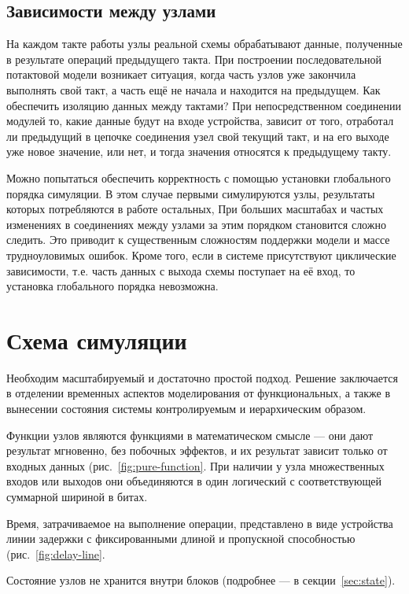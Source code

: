 \subsection{Зависимости между узлами}

На каждом такте работы узлы реальной схемы обрабатывают данные, полученные в результате операций предыдущего такта. При построении последовательной потактовой модели возникает ситуация, когда часть узлов уже закончила выполнять свой такт, а часть ещё не начала и находится на предыдущем. Как обеспечить изоляцию данных между тактами? При непосредственном соединении модулей то, какие данные будут на входе устройства, зависит от того, отработал ли предыдущий в цепочке соединения узел свой текущий такт, и на его выходе уже новое значение, или нет, и тогда значения относятся к предыдущему такту. 

Можно попытаться обеспечить корректность с помощью установки глобального порядка симуляции. В этом случае первыми симулируются узлы, результаты которых потребляются в работе остальных, При больших масштабах и частых изменениях в соединениях между узлами за этим порядком становится сложно следить. Это приводит к существенным сложностям поддержки модели и массе трудноуловимых ошибок. Кроме того, если в системе присутствуют циклические зависимости, т.е. часть данных с выхода схемы поступает на её вход, то установка глобального порядка невозможна.

\section{Схема симуляции}

Необходим масштабируемый и достаточно простой подход. Решение заключается в отделении временных аспектов моделирования от функциональных, а также в вынесении состояния системы контролируемым и иерархическим образом. 

\begin{itemize*}
    \item Функции узлов являются функциями в математическом смысле --- они дают результат мгновенно, без побочных эффектов, и их результат зависит только от входных данных (рис.~\ref{fig:pure-function}. При наличии у узла множественных входов или выходов они объединяются в один логический с соответствующей суммарной шириной в битах. 
    \item Время, затрачиваемое на выполнение операции, представлено в виде устройства линии задержки с фиксированными длиной и пропускной способностью (рис.~\ref{fig:delay-line}.
    \item Состояние узлов не хранится внутри блоков (подробнее --- в секции~\ref{sec:state}).
\end{itemize*}

